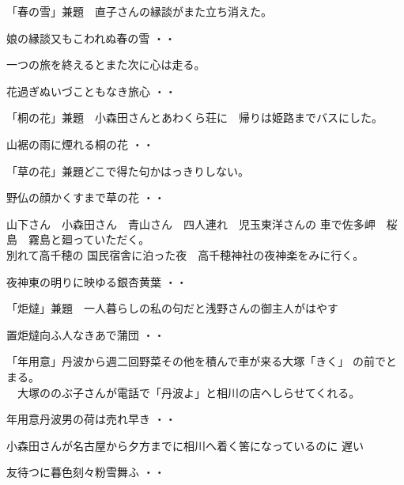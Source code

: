 \vspace{0.6cm}
「春の雪」兼題　直子さんの縁談がまた立ち消えた。
\begin{shiika}娘の縁談又もこわれぬ春の雪
\hfill{・・}\end{shiika}

\vspace{0.6cm}
一つの旅を終えるとまた次に心は走る。
\begin{shiika}花過ぎぬいづこともなき旅心
\hfill{・・}\end{shiika}
\vspace{0.6cm}
「桐の花」兼題　小森田さんとあわくら荘に　帰りは姫路までバスにした。
\begin{shiika}山裾の雨に煙れる桐の花
\hfill{・・}\end{shiika}
\vspace{0.6cm}
「草の花」兼題どこで得た句かはっきりしない。
\begin{shiika}野仏の顔かくすまで草の花
\hfill{・・}\end{shiika}
\vspace{0.6cm}
山下さん　小森田さん　青山さん　四人連れ　児玉東洋さんの
車で佐多岬　桜島　霧島と廻っていただく。\\別れて高千穂の
国民宿舎に泊った夜　高千穂神社の夜神楽をみに行く。
\begin{shiika}夜神東の明りに映ゆる銀杏黄葉
\hfill{・・}\end{shiika}
\vspace{0.6cm}
「炬燵」兼題　一人暮らしの私の句だと浅野さんの御主人がはやす
\begin{shiika}置炬燵向ふ人なきあで蒲団
\hfill{・・}\end{shiika}
\vspace{0.6cm}
「年用意」丹波から週二回野菜その他を積んで車が来る大塚「きく」
の前でとまる。\\　大塚ののぶ子さんが電話で「丹波よ」と相川の店へしらせてくれる。
\begin{shiika}年用意丹波男の荷は売れ早き
\hfill{・・}\end{shiika}
\vspace{0.6cm}
\vspace{0.6cm}
小森田さんが名古屋から夕方までに相川へ着く筈になっているのに
遅い
\begin{shiika}友待つに暮色刻々粉雪舞ふ
\hfill{・・}\end{shiika}
